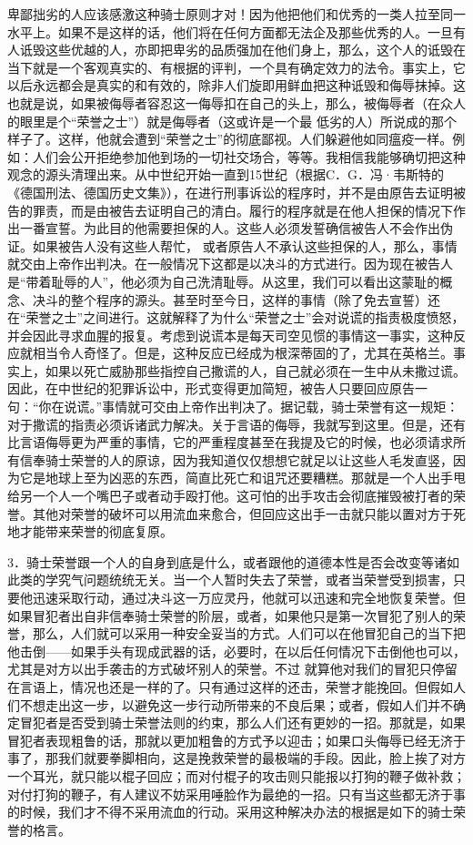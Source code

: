 \documentclass[12pt,oneside]{book}
\begin{document}
卑鄙拙劣的人应该感激这种骑士原则才对！因为他把他们和优秀的一类人拉至同一水平上。如果不是这样的话，他们将在任何方面都无法企及那些优秀的人。一旦有人诋毁这些优越的人，亦即把卑劣的品质强加在他们身上，那么，这个人的诋毁在当下就是一个客观真实的、有根据的评判，一个具有确定效力的法令。事实上，它以后永远都会是真实的和有效的，除非人们旋即用鲜血把这种诋毁和侮辱抹掉。这也就是说，如果被侮辱者容忍这一侮辱扣在自己的头上，那么，被侮辱者（在众人的眼里是个“荣誉之士”）就是侮辱者（这或许是一个最
低劣的人）所说成的那个样子了。这样，他就会遭到“荣誉之士”的彻底鄙视。人们躲避他如同瘟疫一样。例如：人们会公开拒绝参加他到场的一切社交场合，等等。我相信我能够确切把这种观念的源头清理出来。从中世纪开始一直到15世纪（根据C．G．冯·韦斯特的《德国刑法、德国历史文集》），在进行刑事诉讼的程序时，并不是由原告去证明被告的罪责，而是由被告去证明自己的清白。履行的程序就是在他人担保的情况下作出一番宣誓。为此目的他需要担保的人。这些人必须发誓确信被告人不会作出伪证。如果被告人没有这些人帮忙，
或者原告人不承认这些担保的人，那么，事情就交由上帝作出判决。在一般情况下这都是以决斗的方式进行。因为现在被告人是“带着耻辱的人”，他必须为自己洗清耻辱。从这里，我们可以看出这蒙耻的概念、决斗的整个程序的源头。甚至时至今日，这样的事情（除了免去宣誓）还在“荣誉之士”之间进行。这就解释了为什么“荣誉之士”会对说谎的指责极度愤怒，并会因此寻求血腥的报复。考虑到说谎本是每天司空见惯的事情这一事实，这种反应就相当令人奇怪了。但是，这种反应已经成为根深蒂固的了，尤其在英格兰。事实上，如果以死亡威胁那些指控自己撒谎的人，自己就必须在一生中从未撒过谎。因此，在中世纪的犯罪诉讼中，形式变得更加简短，被告人只要回应原告一句：“你在说谎。”事情就可交由上帝作出判决了。据记载，骑士荣誉有这一规矩：对于撒谎的指责必须诉诸武力解决。关于言语的侮辱，我就写到这里。但是，还有比言语侮辱更为严重的事情，它的严重程度甚至在我提及它的时候，也必须请求所有信奉骑士荣誉的人的原谅，因为我知道仅仅想想它就足以让这些人毛发直竖，因为它是地球上至为凶恶的东西，简直比死亡和诅咒还要糟糕。那就是一个人出手甩给另一个人一个嘴巴子或者动手殴打他。这可怕的出手攻击会彻底摧毁被打者的荣誉。其他对荣誉的破坏可以用流血来愈合，但回应这出手一击就只能以置对方于死地才能带来荣誉的彻底复原。 

3．骑士荣誉跟一个人的自身到底是什么，或者跟他的道德本性是否会改变等诸如此类的学究气问题统统无关。当一个人暂时失去了荣誉，或者当荣誉受到损害，只要他迅速采取行动，通过决斗这一万应灵丹，他就可以迅速和完全地恢复荣誉。但如果冒犯者出自非信奉骑士荣誉的阶层，或者，如果他只是第一次冒犯了别人的荣誉，那么，人们就可以采用一种安全妥当的方式。人们可以在他冒犯自己的当下把他击倒——如果手头有现成武器的话，必要时，在以后任何情况下击倒他也可以，尤其是对方以出手袭击的方式破坏别人的荣誉。不过
就算他对我们的冒犯只停留在言语上，情况也还是一样的了。只有通过这样的还击，荣誉才能挽回。但假如人们不想走出这一步，以避免这一步行动所带来的不良后果；或者，假如人们并不确定冒犯者是否受到骑士荣誉法则的约束，那么人们还有更妙的一招。那就是，如果冒犯者表现粗鲁的话，那就以更加粗鲁的方式予以迎击；如果口头侮辱已经无济于事了，那我们就要拳脚相向，这是挽救荣誉的最极端的手段。因此，脸上挨了对方一个耳光，就只能以棍子回应；而对付棍子的攻击则只能报以打狗的鞭子做补救；对付打狗的鞭子，有人建议不妨采用唾脸作为最绝的一招。只有当这些都无济于事的时候，我们才不得不采用流血的行动。采用这种解决办法的根据是如下的骑士荣誉的格言。 
\end{document}
